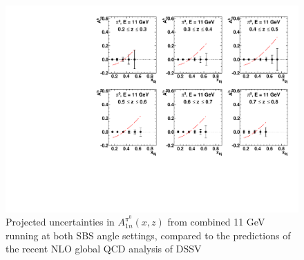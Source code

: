 \begin{figure}[h]
  \begin{center}
    \includegraphics[width=.75\textwidth]{figures/A1n_vs_x_E11_pi0.pdf}
  \end{center}
  \caption{\label{A1n_pi0_11gev} Projected uncertainties in $A_{1n}^{\pi^0}(x,z)$ from combined 11 GeV running at both SBS angle settings, compared to the predictions of the recent NLO global QCD analysis of DSSV~\cite{DSSVplus}}
\end{figure}

